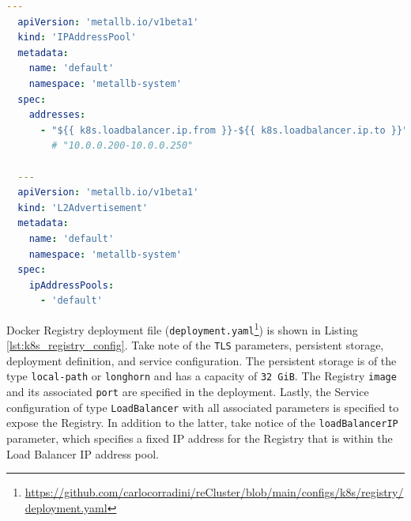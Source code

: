 \begin{lstlisting}[language=yaml, alsoletter={.}, morekeywords={[2]{apiVersion, kind, metadata, name, namespace, spec, addresses, ipAddressPools}}, xleftmargin=\parindent, label={lst:k8s_metallb_config}, caption=MetalLB configuration file]
  ---
  apiVersion: 'metallb.io/v1beta1'
  kind: 'IPAddressPool'
  metadata:
    name: 'default'
    namespace: 'metallb-system'
  spec:
    addresses:
      - "${{ k8s.loadbalancer.ip.from }}-${{ k8s.loadbalancer.ip.to }}"
        # "10.0.0.200-10.0.0.250"

  ---
  apiVersion: 'metallb.io/v1beta1'
  kind: 'L2Advertisement'
  metadata:
    name: 'default'
    namespace: 'metallb-system'
  spec:
    ipAddressPools:
      - 'default'
\end{lstlisting}

Docker Registry deployment file (\texttt{deployment.yaml}\footnote{\url{https://github.com/carlocorradini/reCluster/blob/main/configs/k8s/registry/deployment.yaml}})
is shown in Listing \ref{lst:k8s_registry_config}. Take note of the \texttt{TLS}
parameters, persistent storage, deployment definition, and service configuration.
The persistent storage is of the type \texttt{local-path} or \texttt{longhorn}
and has a capacity of \texttt{32 GiB}. The Registry \texttt{image} and its associated
\texttt{port} are specified in the deployment. Lastly, the Service configuration
of type \texttt{LoadBalancer} with all associated parameters is specified to expose
the Registry. In addition to the latter, take notice of the \texttt{loadBalancerIP}
parameter, which specifies a fixed IP address for the Registry that is within the
Load Balancer IP address pool.

